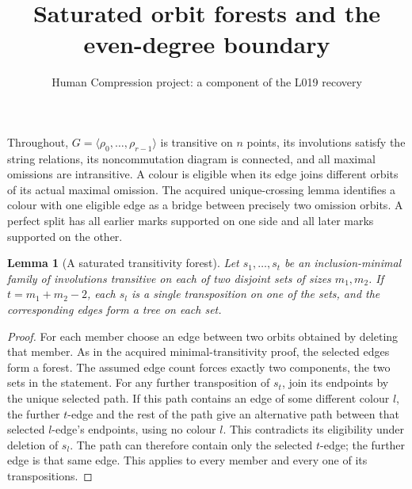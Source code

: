 \documentclass[11pt,a4paper]{article}
\title{Saturated orbit forests and the even-degree boundary}
\author{Human Compression project: a component of the L019 recovery}
\date{}
\newtheorem{lemma}{Lemma}
\newcommand{\gen}[1]{\langle#1\rangle}
\begin{document}
\maketitle
Throughout, $G=\gen{\rho_0,\ldots,\rho_{r-1}}$ is transitive
on $n$ points, its involutions satisfy the string relations,
its noncommutation diagram is connected, and all maximal
omissions are intransitive. A colour is eligible when its edge
joins different orbits of its actual maximal omission.
The acquired unique-crossing lemma identifies a colour with
one eligible edge as a bridge between precisely two omission
orbits. A perfect split has all earlier marks supported on one
side and all later marks supported on the other.

\begin{lemma}[A saturated transitivity forest]\label{maximal}
Let $s_1,\ldots,s_t$ be an inclusion-minimal family of
involutions transitive on each of two disjoint sets of sizes
$m_1,m_2$. If $t=m_1+m_2-2$, each $s_l$ is a single
transposition on one of the sets, and the corresponding edges
form a tree on each set.
\end{lemma}
\begin{proof}
For each member choose an edge between two orbits obtained
by deleting that member. As in the acquired minimal-transitivity
proof, the selected edges form a forest. The assumed edge count
forces exactly two components, the two sets in the statement.
For any further transposition of $s_t$, join its endpoints
by the unique selected path. If this path contains an edge
of some different colour $l$, the further $t$-edge and the
rest of the path give an alternative path between that
selected $l$-edge's endpoints, using no colour $l$.
This contradicts its eligibility under deletion of $s_l$.
The path can therefore contain only the selected $t$-edge;
the further edge is that same edge. This applies to every
member and every one of its transpositions.
\end{proof}
\end{document}
